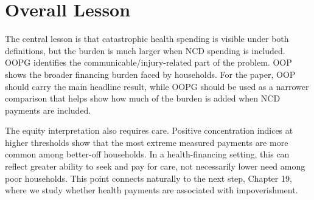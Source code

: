 \documentclass[11pt]{article}
\begin{document}
\clearpage
\section*{Overall Lesson}

The central lesson is that catastrophic health spending is visible under both
definitions, but the burden is much larger when NCD spending is included. OOPG
identifies the communicable/injury-related part of the problem. OOP shows the
broader financing burden faced by households. For the paper, OOP should carry
the main headline result, while OOPG should be used as a narrower comparison
that helps show how much of the burden is added when NCD payments are included.

The equity interpretation also requires care. Positive concentration indices at
higher thresholds show that the most extreme measured payments are more common
among better-off households. In a health-financing setting, this can reflect
greater ability to seek and pay for care, not necessarily lower need among poor
households. This point connects naturally to the next step, Chapter 19, where we
study whether health payments are associated with impoverishment.
\end{document}
